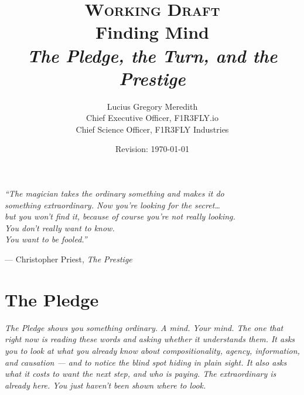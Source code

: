 \documentclass[12pt,openright,twoside]{book}
\title{%
  \vspace{-0.8in}
  {\large\scshape Working Draft}\\[0.6em]
  {\Huge\bfseries Finding Mind}\\[0.5em]
  {\large\itshape The Pledge, the Turn, and the Prestige}
}
\author{%
  Lucius Gregory Meredith\\[0.3em]
  {\small Chief Executive Officer, F1R3FLY.io}\\
  {\small Chief Science Officer, F1R3FLY Industries}
}
\date{Revision: \today}
\theoremstyle{remark}
\theoremstyle{plain}
\theoremstyle{remark}
\theoremstyle{plain}
\theoremstyle{plain}
\begin{document}

\maketitle
\thispagestyle{empty}

\newpage
\thispagestyle{empty}
\vspace*{\fill}
\begin{center}
  \large\itshape
  ``The magician takes the ordinary something and makes it do\\
  something extraordinary. Now you're looking for the secret\ldots{}\\
  but you won't find it, because of course you're not really looking.\\
  You don't really want to know.\\
  You want to be fooled.''
  \medskip

  \normalsize\upshape --- Christopher Priest, \textit{The Prestige}
\end{center}
\vspace*{\fill}
\newpage

\tableofcontents
\newpage

\part{The Pledge}

\vspace{1em}
\begin{mdframed}[backgroundcolor=remarkgray, linecolor=gray!60,
                 linewidth=1pt, topline=false, rightline=false,
                 bottomline=false]
\small\itshape
The Pledge shows you something ordinary.
A mind. Your mind.
The one that right now is reading these words and asking whether it
understands them.
It asks you to look at what you already know about compositionality,
agency, information, and causation --- and to notice the blind spot
hiding in plain sight.
It also asks what it costs to want the next step, and who is paying.
The extraordinary is already here.
You just haven't been shown where to look.
\end{mdframed}
\end{document}
